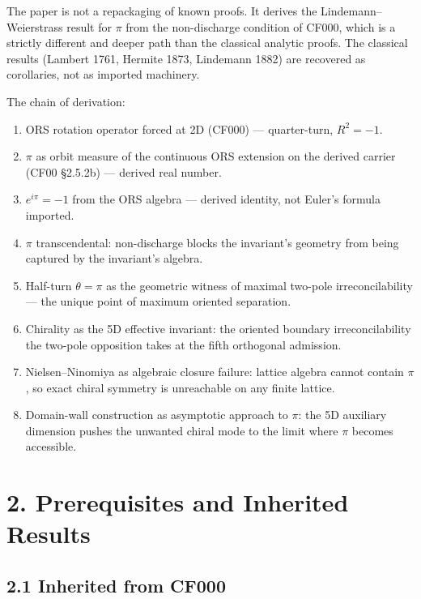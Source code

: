\documentclass[11pt]{article}
\theoremstyle{definition}
\theoremstyle{remark}
\begin{document}
The paper is not a repackaging of known proofs. It derives the
Lindemann--Weierstrass result for $\pi$ from the non-discharge condition
of CF000, which is a strictly different and deeper path than the classical
analytic proofs. The classical results (Lambert 1761, Hermite 1873,
Lindemann 1882) are recovered as corollaries, not as imported machinery.

The chain of derivation:

\begin{enumerate}[leftmargin=1.6em]
\item ORS rotation operator forced at 2D (CF000) --- quarter-turn, $R^2=-1$.
\item $\pi$ as orbit measure of the continuous ORS extension on the
  derived carrier (CF00 \S 2.5.2b) --- derived real number.
\item $e^{i\pi}=-1$ from the ORS algebra --- derived identity, not
  Euler's formula imported.
\item $\pi$ transcendental: non-discharge blocks the invariant's
  geometry from being captured by the invariant's algebra.
\item Half-turn $\theta=\pi$ as the geometric witness of maximal
  two-pole irreconcilability --- the unique point of maximum oriented
  separation.
\item Chirality as the 5D effective invariant: the oriented boundary
  irreconcilability the two-pole opposition takes at the fifth
  orthogonal admission.
\item Nielsen--Ninomiya as algebraic closure failure: lattice algebra
  cannot contain $\pi$, so exact chiral symmetry is unreachable on any
  finite lattice.
\item Domain-wall construction as asymptotic approach to $\pi$: the
  5D auxiliary dimension pushes the unwanted chiral mode to the limit
  where $\pi$ becomes accessible.
\end{enumerate}

\section{2. Prerequisites and Inherited Results}

\subsection{2.1 Inherited from CF000}
\end{document}
